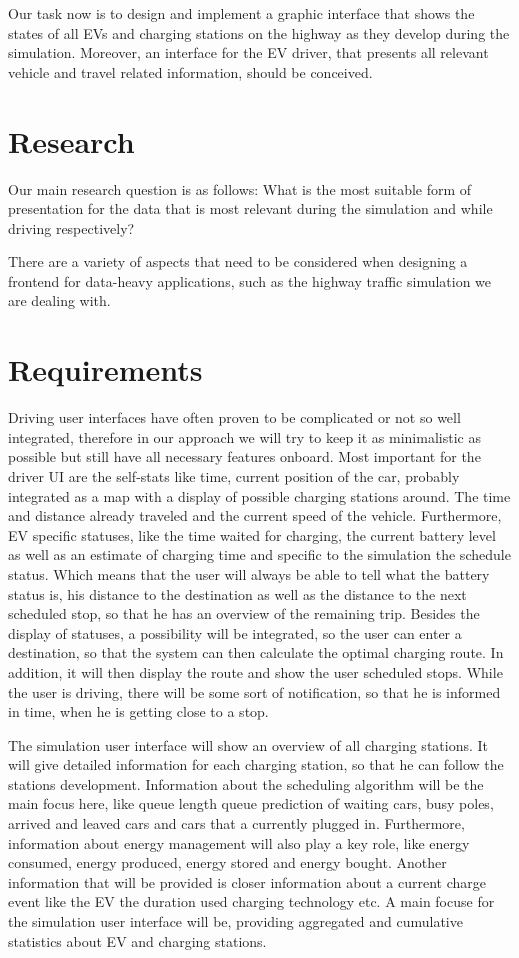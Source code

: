 \documentclass[hidelinks]{sig-alternate}
\begin{document}
Our task now is to design and implement a graphic interface that shows the states of all EVs and charging stations on
the highway as they develop during the simulation. Moreover, an interface for the EV driver, that presents all
relevant vehicle and travel related information, should be conceived.


\section{Research}

Our main research question is as follows: What is the most suitable form of presentation for the data that is most
relevant during the simulation and while driving respectively?

There are a variety of aspects that need to be considered when designing a frontend for data-heavy applications,
such as the highway traffic simulation we are dealing with.


\section{Requirements}

Driving user interfaces have often proven to be complicated or not so well integrated, therefore in our approach we
will try to keep it as minimalistic as possible but still have all necessary features onboard. Most important for the
driver UI are the self-stats like time, current position of the car, probably integrated as a map with a display of
possible charging stations around. The time and distance already traveled and the current speed of the vehicle.
Furthermore, EV specific statuses, like the time waited for charging, the current battery level as well as an
estimate of charging time and specific to the simulation the schedule status. Which means that the user will always
be able to tell what the battery status is, his distance to the destination as well as the distance to the next
scheduled stop, so that he has an overview of the remaining trip. Besides the display of statuses, a possibility
will be integrated, so the user can enter a destination, so that the system can then calculate the optimal charging
route. In addition, it will then display the route and show the user scheduled stops. While the user is driving,
there will be some sort of notification, so that he is informed in time, when he is getting close to a stop.

The simulation user interface will show an overview of all charging stations. It will give detailed information for
each charging station, so that he can follow the stations development. Information about the scheduling algorithm
will be the main focus here, like queue length queue prediction of waiting cars, busy poles, arrived and leaved cars
and cars that a currently plugged in. Furthermore, information about energy management will also play a key role,
like energy consumed, energy produced, energy stored and energy bought. Another information that will be provided is
closer information about a current charge event like the EV the duration used charging technology etc. A main focuse
for the simulation user interface will be, providing aggregated and cumulative statistics about EV and charging
stations.
\end{document}
